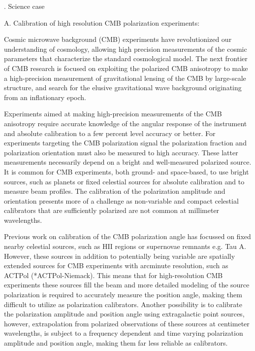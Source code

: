 \documentclass[a4paper,12pt]{article}
\begin{document}
.
Science case

A. Calibration of high resolution CMB polarization experiments:

Cosmic microwave background (CMB) experiments have revolutionized our
understanding of cosmology, allowing high precision measurements of
the cosmic parameters that characterize the standard cosmological
model. The next frontier of CMB research is focused on exploiting the
polarized CMB anisotropy to make a high-precision measurement of
gravitational lensing of the CMB by large-scale structure, and search
for the elusive gravitational wave background originating from an
inflationary epoch.  

Experiments aimed at making high-precision measurements of the CMB
anisotropy require accurate knowledge of the angular response of the
instrument and absolute calibration to a few percent level accuracy or
better. For experiments targeting the CMB polarization signal the
polarization fraction and polarization orientation must also be
measured to high accuracy. These latter measurements necessarily
depend on a bright and well-measured polarized source. It is common
for CMB experiments, both ground- and space-based, to use bright
sources, such as planets or fixed celestial sources for absolute
calibration and to measure beam profiles. The calibration of the
polarization amplitude and orientation presents more of a challenge as
non-variable and compact celestial calibrators that are sufficiently
polarized are not common at millimeter wavelengths. 
 
Previous work on calibration of the CMB polarization angle has
focussed on fixed nearby celestial sources, such as HII regions or
supernovae remnants e.g. Tau A. However, these sources in addition to
potentially being variable are spatially extended sources for CMB
experiments with arcminute resolution, such as ACTPol
(*ACTPol-Niemack). This means that for high-resolution CMB experiments
these sources fill the beam and more detailed modeling of the source
polarization is required to accurately measure the position angle,
making them difficult to utilize as polarization calibrators. Another
possibility is to calibrate the polarization amplitude and position
angle using extragalactic point sources, however, extrapolation from
polarized observations of these sources at centimeter wavelengths, is
subject to a frequency dependent and time varying polarization
amplitude and position angle, making them far less reliable as
calibrators. 
\end{document}
